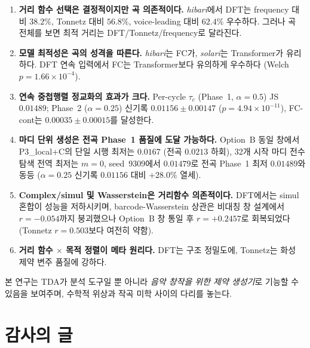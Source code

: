 \documentclass[conference,10pt,a4paper]{IEEEtran}
\begin{document}
\begin{enumerate}
\item \textbf{거리 함수 선택은 결정적이지만 곡 의존적이다.}
      \emph{hibari}에서 DFT는 frequency 대비 $38.2\%$,
      Tonnetz 대비 $56.8\%$, voice-leading 대비 $62.4\%$ 우수하다.
      그러나 곡 전체를 보면 최적 거리는 DFT/Tonnetz/frequency로 달라진다.

\item \textbf{모델 최적성은 곡의 성격을 따른다.}
      \emph{hibari}는 FC가, \emph{solari}는 Transformer가 유리하다.
      DFT 연속 입력에서 FC는 Transformer보다 유의하게 우수하다
      (Welch $p=1.66\times10^{-4}$).

\item \textbf{연속 중첩행렬 정교화의 효과가 크다.}
      Per-cycle $\tau_c$ (Phase~1, $\alpha=0.5$) JS $0.01489$;
      Phase~2 ($\alpha=0.25$) 신기록 $\mathbf{0.01156 \pm 0.00147}$ ($p=4.94\times10^{-11}$),
      FC-cont는
      $0.00035 \pm 0.00015$를 달성한다.

\item \textbf{마디 단위 생성은 전곡 Phase~1 품질에 도달 가능하다.}
      Option~B 동일 창에서 P3\_local+C의 단일 시행 최저는 $0.0167$ (전곡 $0.0213$ 하회),
      32개 시작 마디 전수 탐색 전역 최저는 $m=0$, seed~9309에서 $0.01479$로
      전곡 Phase~1 최저 $0.01489$와 동등 ($\alpha=0.25$ 신기록 $0.01156$ 대비 $+28.0\%$ 열세).

\item \textbf{Complex/simul 및 Wasserstein은 거리함수 의존적이다.}
      DFT에서는 simul 혼합이 성능을 저하시키며,
      barcode-Wasserstein 상관은 비대칭 창 설계에서 $r=-0.054$까지 붕괴했으나
      Option~B 창 통일 후 $r=+0.2457$로 회복되었다 (Tonnetz $r=0.503$보다 여전히 약함).

\item \textbf{거리 함수 $\times$ 목적 정렬이 메타 원리다.}
      DFT는 구조 정밀도에, Tonnetz는 화성 제약 변주 품질에 강하다.
\end{enumerate}

본 연구는 TDA가 분석 도구일 뿐 아니라 \emph{음악 창작을 위한
제약 생성기}로 기능할 수 있음을 보여주며,
수학적 위상과 작곡 미학 사이의 다리를 놓는다.


\section*{감사의 글}
\end{document}

